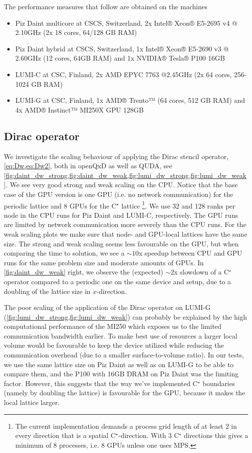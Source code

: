 The performance measures that follow are obtained on the machines
\begin{itemize}
    \item Piz Daint multicore at CSCS, Switzerland, 2x Intel® Xeon® E5-2695 v4 @ 2.10GHz (2x 18 cores, 64/128 GB RAM)
    \item Piz Daint hybrid at CSCS, Switzerland, 1x Intel® Xeon® E5-2690 v3 @ 2.60GHz (12 cores, 64GB RAM) and 1x NVIDIA® Tesla® P100 16GB
    \item LUMI-C at CSC, Finland, 2x AMD EPYC 7763 @2.45GHz (2x 64 cores, 256-1024 GB RAM)
    \item LUMI-G at CSC, Finland, 1x AMD® Trento™ (64 cores, 512 GB RAM) and 4x AMD® Instinct™ MI250X GPU 128GB
\end{itemize}

\subsection{Dirac operator}

We investigate the scaling behaviour of applying the Dirac stencil operator, \cref{eq:Dw,eq:Dw2}, both in openQxD as well as  QUDA, see \cref{fig:daint_dw_strong,fig:daint_dw_weak,fig:lumi_dw_strong,fig:lumi_dw_weak}. We see very good strong and weak scaling on the CPU. Notice that the base case of the GPU version is one GPU (i.e. no network communication) for the periodic lattice and 8 GPUs for the C$^\star$ lattice \footnote{The current implementation demands a process grid length of at least 2 in every direction that is a spatial C$^\star$-direction. With 3 C$^\star$ directions this gives a minimum of 8 processes, i.e. 8 GPUs unless one uses MPS.}. We use 32 and 128 ranks per node in the CPU runs for Piz Daint and LUMI-C, respectively. The GPU runs are limited by network communication more severely than the CPU runs. For the weak scaling plots we make sure that node- and GPU-local lattices have the same size. The strong and weak scaling seems less favourable on the GPU, but when comparing the time to solution, we see a $\sim10$x speedup between CPU and GPU runs for the same problem size and moderate amounts of GPUs. In \cref{fig:daint_dw_weak} right, we observe the (expected) $\sim2$x slowdown of a C$^\star$ operator compared to a periodic one on the same device and setup, due to a doubling of the lattice size in $x$-direction.

The poor scaling of the application of the Dirac operator on LUMI-G (\cref{fig:lumi_dw_strong,fig:lumi_dw_weak}) can probably be explained by the high computational performance of the MI250 which exposes us to the limited communication bandwidth earlier. To make best use of resources a larger local volume would be favourable to keep the device utilized while reducing the communication overhead (due to a smaller surface-to-volume ratio). In our tests, we use the same lattice size on Piz Daint as well as on LUMI-G to be able to compare them, and the P100 with 16GB DRAM on Piz Daint was the limiting factor. However, this suggests that the way we've implemented C$^\star$ boundaries (namely by doubling the lattice) is favourable for the GPU, because it makes the local lattice larger.

